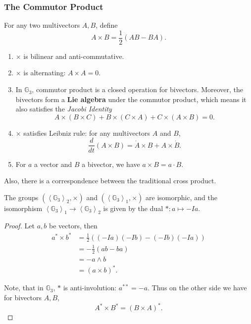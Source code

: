 \subsubsection{The Commutor Product}

\begin{definition}
	For any two multivectors $A, B$, define
	\[
		A \times B = \frac{1}{2}(AB - BA)
	.\] 
\end{definition}

\begin{proposition}
	\begin{enumerate}


		\item $\times $ is bilinear and anti-commutative. 
		\item $\times $ is alternating: $A \times A = 0$.
		\item In $\mathbb{G}_3$, commutor product is a closed operation for bivectors. Moreover, the bivectors form a \textbf{Lie algebra} under the commutor product, which means it also satisfies the \textit{Jacobi Identity} 
\[
	A \times (B \times C) + B \times (C \times A) + C \times (A \times B) = 0
.\] 
		\item $\times $ satisfies Leibniz rule: for any multivectors $A$ and $B$, 
			\[
				\frac{d}{dt} (A \times B)
				= \dot A \times B + A \times \dot B
			.\] 
		\item For $a$ a vector and $B$ a bivector, we have $a \times B = a \cdot B$.
	\end{enumerate}
	
\end{proposition}


Also, there is a correspondence between the traditional cross product. 

\begin{proposition}
	The groups $\left(\left\langle \mathbb{G}_3 \right\rangle _2, \times \right)$ and $\left( \left\langle \mathbb{G}_3 \right\rangle _1, \times  \right) $ are isomorphic, and the isomorphism $\left\langle \mathbb{G}_3 \right\rangle _1 \to \left\langle \mathbb{G}_3 \right\rangle _2$ is given by the dual $*: a \mapsto -Ia$.
\end{proposition}
\begin{proof}
	Let $a,b$ be vectors, then 
	\begin{align*}
		a^* \times b^*
		&= \frac{1}{2}\left( (-Ia)(-Ib) - (-Ib) (-Ia) \right)  \\
		&= - \frac{1}{2} (ab - ba) \\
		&= - a \wedge b \\
		&= (a \times b)^*
	.\end{align*}

	Note, that in $\mathbb{G}_3$, $*$ is anti-involution: $a^{* *} = - a$. Thus on the other side we have for bivectors $A, B$,
	\[
		A^* \times B^* = (B \times A)^*
	.\] 
\end{proof}


